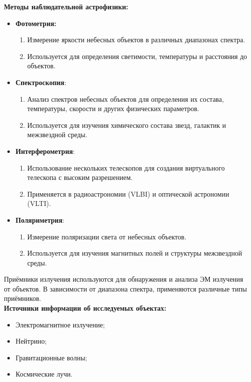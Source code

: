 \documentclass[12pt]{article}
\begin{document}
		\textbf{Методы наблюдательной астрофизики:}
	\begin{itemize}
		\item \textbf{Фотометрия:}
		\begin{enumerate}
			\item Измерение яркости небесных объектов в различных диапазонах спектра.
			\item Используется для определения светимости, температуры и расстояния до объектов.
		\end{enumerate}
		\item\textbf{Спектроскопия}:	
		\begin{enumerate}
			\item Анализ спектров небесных объектов для определения их состава, температуры, скорости и других физических параметров.
			\item Используется для изучения химического состава звезд, галактик и межзвездной среды.
		\end{enumerate}
		
		\item\textbf{Интерферометрия}:	
		\begin{enumerate}
			\item Использование нескольких телескопов для создания виртуального телескопа с высоким разрешением.
			\item Применяется в радиоастрономии (VLBI) и оптической астрономии (VLTI).
		\end{enumerate}	
		
		
		\item\textbf{Поляриметрия}:	
		\begin{enumerate}
			\item 	Измерение поляризации света от небесных объектов.
			\item Используется для изучения магнитных полей и структуры межзвездной среды.
		\end{enumerate}
	\end{itemize}
	Приёмники излучения используются для обнаружения и анализа ЭМ излучения от объектов. В зависимости от диапазона спектра, применяются различные типы приёмников.\\
	\textbf{Источники информации об исследуемых объектах:}
	\begin{itemize}
		\item Электромагнитное излучение;
		\item Нейтрино;
		\item Гравитационные волны;
		\item Космические лучи.
	\end{itemize}
	
\end{document}
